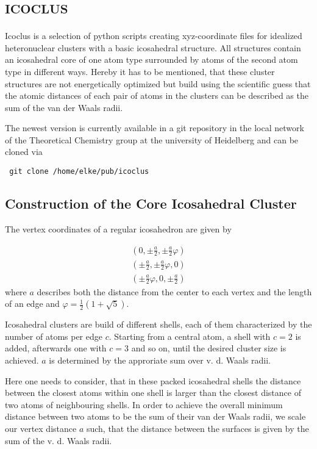 \section{\textsc{icoclus}}

Icoclus is a selection of python scripts creating xyz-coordinate
files for idealized heteronuclear clusters with a basic
icosahedral structure.
All structures contain an icosahedral core of one atom type
surrounded by atoms of the second atom type in different ways.
Hereby it has to be mentioned, that these cluster structures are not
energetically optimized but build using the scientific guess
that the atomic distances of each pair of atoms in the clusters
can be described as the sum of the van der Waals
radii.

The newest version is currently available in a git repository in the local
network of the Theoretical Chemistry group at the university of
Heidelberg and can be cloned via
\begin{verbatim}
 git clone /home/elke/pub/icoclus 
\end{verbatim}


\subsection{Construction of the Core Icosahedral Cluster}
The vertex coordinates of a regular icosahedron are given by

\begin{align}
  \left(  0 , \pm \frac a2 ,  \pm\frac a2 \varphi \right) \nonumber\\
  \left(  \pm\frac a2 , \pm \frac a2 \varphi ,  0 \right) \nonumber\\
  \left(  \pm \frac a2 \varphi , 0 ,  \pm\frac a2 \right)
\end{align}
where $a$ describes both the distance from the center to each vertex
and the length of an edge and $\varphi = \frac 12 (1+\sqrt{5})$.

Icosahedral clusters are build of different shells, each of them
characterized by the number of atoms per edge $c$. Starting from a
central atom, a shell with $c=2$ is added, afterwards one with $c=3$
and so on, until the desired cluster size is achieved.
$a$ is determined by the approriate sum over v. d. Waals radii.

Here one needs to consider, that in these packed icosahedral shells
the distance between the closest atoms within one shell is
larger than the closest distance of two atoms of neighbouring shells.
In order to achieve the overall minimum distance between two atoms
to be the sum of their van der Waals radii, we scale our vertex
distance $a$ such, that the distance between the surfaces is given by
the sum of the v. d. Waals radii.

